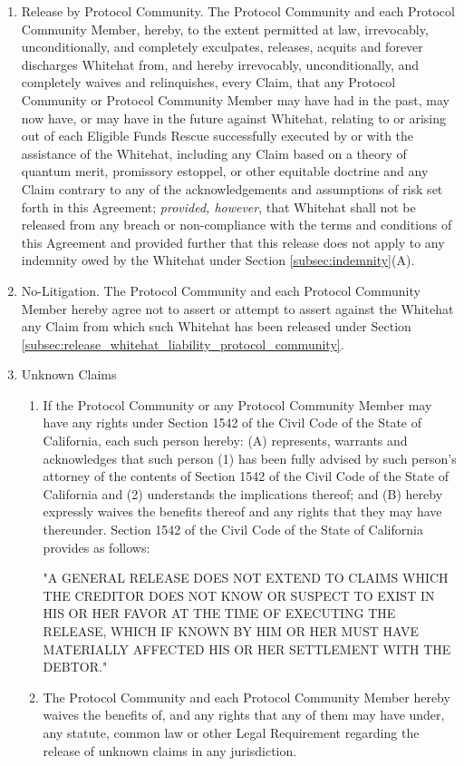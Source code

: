 \documentclass{article}
\begin{document}
\begin{enumerate}[label=\Alph*.]
    \item Release by Protocol Community. The Protocol Community and each Protocol Community Member, hereby, to the extent permitted at law, irrevocably, unconditionally, and completely exculpates, releases, acquits and forever discharges Whitehat from, and hereby irrevocably, unconditionally, and completely waives and relinquishes, every Claim, that any Protocol Community or Protocol Community Member may have had in the past, may now have, or may have in the future against Whitehat, relating to or arising out of each Eligible Funds Rescue successfully executed by or with the assistance of the Whitehat, including any Claim based on a theory of quantum merit, promissory estoppel, or other equitable doctrine and any Claim contrary to any of the acknowledgements and assumptions of risk set forth in this Agreement; \textit{provided, however}, that Whitehat shall not be released from any breach or non-compliance with the terms and conditions of this Agreement and provided further that this release does not apply to any indemnity owed by the Whitehat under Section \ref{subsec:indemnity}(A).

    \item No-Litigation. The Protocol Community and each Protocol Community Member hereby agree not to assert or attempt to assert against the Whitehat any Claim from which such Whitehat has been released under Section \ref{subsec:release_whitehat_liability_protocol_community}.

    \item Unknown Claims

          \begin{enumerate}

              \item If the Protocol Community or any Protocol Community Member may have any rights under Section 1542 of the Civil Code of the State of California, each such person hereby: (A) represents, warrants and acknowledges that such person (1) has been fully advised by such person's attorney of the contents of Section 1542 of the Civil Code of the State of California and (2) understands the implications thereof; and (B) hereby expressly waives the benefits thereof and any rights that they may have thereunder. Section 1542 of the Civil Code of the State of California provides as follows:

                    "A GENERAL RELEASE DOES NOT EXTEND TO CLAIMS WHICH THE CREDITOR DOES NOT KNOW OR SUSPECT TO EXIST IN HIS OR HER FAVOR AT THE TIME OF EXECUTING THE RELEASE, WHICH IF KNOWN BY HIM OR HER MUST HAVE MATERIALLY AFFECTED HIS OR HER SETTLEMENT WITH THE DEBTOR."

              \item The Protocol Community and each Protocol Community Member hereby waives the benefits of, and any rights that any of them may have under, any statute, common law or other Legal Requirement regarding the release of unknown claims in any jurisdiction.

          \end{enumerate}
\end{enumerate}
\end{document}
